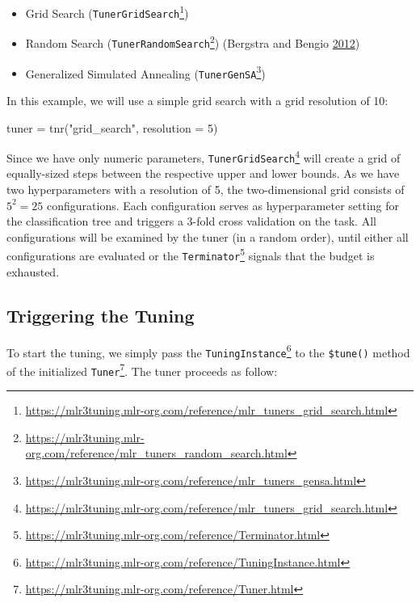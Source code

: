 \documentclass[12pt,]{scrbook}
\newenvironment{Shaded}{}{}
\newcommand{\DataTypeTok}[1]{#1}
\newcommand{\DecValTok}[1]{#1}
\newcommand{\KeywordTok}[1]{\textcolor[rgb]{0.00,0.00,1.00}{#1}}
\newcommand{\NormalTok}[1]{#1}
\newcommand{\StringTok}[1]{\textcolor[rgb]{0.00,0.50,0.50}{#1}}
\providecommand{\tightlist}{%
  \setlength{\itemsep}{0pt}\setlength{\parskip}{0pt}}
\renewcommand{\href}[2]{#2\footnote{\url{#1}}}
\begin{document}
\begin{itemize}
\tightlist
\item
  Grid Search (\href{https://mlr3tuning.mlr-org.com/reference/mlr_tuners_grid_search.html}{\texttt{TunerGridSearch}})
\item
  Random Search (\href{https://mlr3tuning.mlr-org.com/reference/mlr_tuners_random_search.html}{\texttt{TunerRandomSearch}}) (Bergstra and Bengio \protect\hyperlink{ref-bergstra2012}{2012})
\item
  Generalized Simulated Annealing (\href{https://mlr3tuning.mlr-org.com/reference/mlr_tuners_gensa.html}{\texttt{TunerGenSA}})
\end{itemize}

In this example, we will use a simple grid search with a grid resolution of 10:

\begin{Shaded}
\begin{Highlighting}[]
\NormalTok{tuner =}\StringTok{ }\KeywordTok{tnr}\NormalTok{(}\StringTok{"grid_search"}\NormalTok{, }\DataTypeTok{resolution =} \DecValTok{5}\NormalTok{)}
\end{Highlighting}
\end{Shaded}

Since we have only numeric parameters, \href{https://mlr3tuning.mlr-org.com/reference/mlr_tuners_grid_search.html}{\texttt{TunerGridSearch}} will create a grid of equally-sized steps between the respective upper and lower bounds.
As we have two hyperparameters with a resolution of 5, the two-dimensional grid consists of \(5^2 = 25\) configurations.
Each configuration serves as hyperparameter setting for the classification tree and triggers a 3-fold cross validation on the task.
All configurations will be examined by the tuner (in a random order), until either all configurations are evaluated or the \href{https://mlr3tuning.mlr-org.com/reference/Terminator.html}{\texttt{Terminator}} signals that the budget is exhausted.

\hypertarget{tuning-triggering}{%
\subsection{Triggering the Tuning}\label{tuning-triggering}}

To start the tuning, we simply pass the \href{https://mlr3tuning.mlr-org.com/reference/TuningInstance.html}{\texttt{TuningInstance}} to the \texttt{\$tune()} method of the initialized \href{https://mlr3tuning.mlr-org.com/reference/Tuner.html}{\texttt{Tuner}}.
The tuner proceeds as follow:
\end{document}
